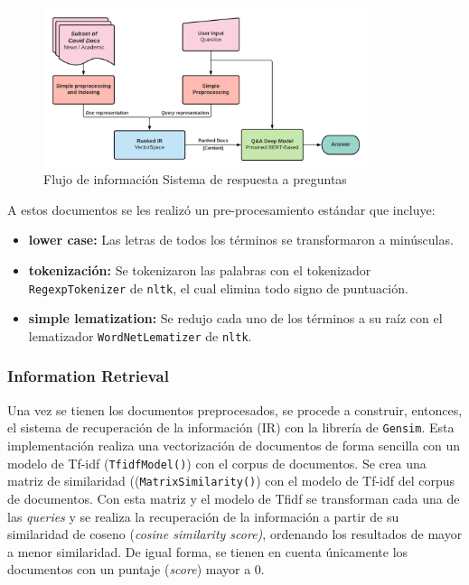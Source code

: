 \begin{figure}[H]
    \centering
    \includegraphics[width=0.85\textwidth]{doc_final/images/QA_System_diag.png}
    \caption{Flujo de información Sistema de respuesta a preguntas}
    \label{fig:qa_diag}
\end{figure}

A estos documentos se les realizó un pre-procesamiento estándar que incluye:
\begin{itemize}
    \item \textbf{lower case:} Las letras de todos los términos se transformaron a minúsculas.
    
    \item \textbf{tokenización:} Se tokenizaron las palabras con el tokenizador \texttt{RegexpTokenizer} de \texttt{nltk}, el cual elimina todo signo de puntuación.
        
    \item \textbf{simple lematization:} Se redujo cada uno de los términos a su raíz con el lematizador \texttt{WordNetLematizer} de \texttt{nltk}.
\end{itemize}

\subsubsection{Information Retrieval}

Una vez se tienen los documentos preprocesados, se procede a construir, entonces, el sistema de recuperación de la información (IR) con la librería de \texttt{Gensim}. Esta implementación realiza una vectorización de documentos de forma sencilla con un modelo de Tf-idf (\texttt{TfidfModel()}) con el corpus de documentos. Se crea una matriz de similaridad ((\texttt{MatrixSimilarity()}) con el modelo de Tf-idf del corpus de documentos. Con esta matriz y el modelo de Tfidf se transforman cada una de las \textit{queries} y se realiza la recuperación de la información a partir de su similaridad de coseno (\textit{cosine similarity score)}, ordenando los resultados de mayor a menor similaridad. De igual forma, se tienen en cuenta únicamente los documentos con un puntaje (\textit{score}) mayor a 0. \\

